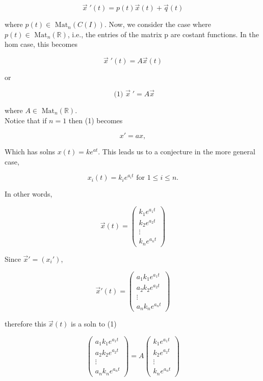 \documentclass[12pt,a4paper]{article}
\theoremstyle{definition}
\begin{document}

\[   \vec{x} \;'(t) = p(t) \vec{x}(t) + \vec{q}(t) \]

where \( p(t) \in \text{ Mat}_n (C(I)) \). Now, we consider the case
where \(  p(t) \in \text{ Mat}_n ( \mathbb{R})  \), i.e., the entries of
the matrix p are costant functions. In the hom case, this becomes 

\[ \vec{x} \;'(t) = A \vec{x}(t) \]

or

\[ \text{ (1) } \vec{x} \;' = A \vec{x} \]

where \( A \in \text{ Mat}_n ( \mathbb{R})  \). \\

Notice that if \( n = 1 \) then (1) becomes 

\[ x' = ax, \]

Which has solns  \( x(t) = ke^{at}. \) This leads us to a conjecture in
the more general case, 

\[ x_i(t) = k_ie^{a_it} \text{ for } 1 \leq i \leq n.\]

In other words, 

\[ \vec{x}(t) =
\begin{pmatrix}
  k_1e^{a_1t} \\
  k_2e^{a_2t} \\
  \vdots \\
  k_ne^{a_nt} 
\end{pmatrix}\]

Since \( \vec{x}' = (x_i') \), 

\[ \vec{x}'(t) =
\begin{pmatrix}
  a_1k_1e^{a_1t} \\
  a_2k_2e^{a_2t} \\
  \vdots \\
  a_nk_ne^{a_nt} 
\end{pmatrix}\]

therefore this \( \vec{x}(t) \) is a soln to (1) \iff

\[ 
\begin{pmatrix}
  a_1k_1e^{a_1t} \\
  a_2k_2e^{a_2t} \\
  \vdots \\
  a_nk_ne^{a_nt} 
\end{pmatrix}
=A
\begin{pmatrix}
  k_1e^{a_1t} \\
  k_2e^{a_2t} \\
  \vdots \\
  k_ne^{a_nt} 
\end{pmatrix}
\]
\end{document}
